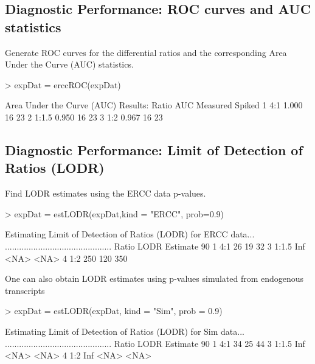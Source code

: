 \documentclass{article}
\begin{document}
\subsection{Diagnostic Performance: ROC curves and AUC statistics}
Generate ROC curves for the differential ratios and the corresponding Area Under
the Curve (AUC) statistics.
\begin{center}
\begin{Schunk}
\begin{Sinput}
> expDat = erccROC(expDat)
\end{Sinput}
\begin{Soutput}
Area Under the Curve (AUC) Results:
  Ratio   AUC Measured Spiked
1   4:1 1.000       16     23
2 1:1.5 0.950       16     23
3   1:2 0.967       16     23
\end{Soutput}
\end{Schunk}
\end{center}

\subsection{Diagnostic Performance: Limit of Detection of Ratios (LODR)}
Find LODR estimates using the ERCC data p-values.
\begin{center}
\begin{Schunk}
\begin{Sinput}
> expDat = estLODR(expDat,kind = "ERCC", prob=0.9)
\end{Sinput}
\begin{Soutput}
Estimating Limit of Detection of Ratios (LODR) for  ERCC  data...
.............................................
  Ratio LODR Estimate 90%
1   4:1            26                 19                 32
3 1:1.5           Inf               <NA>               <NA>
4   1:2           250                120                350
\end{Soutput}
\end{Schunk}
\end{center}


One can also obtain LODR estimates using p-values simulated from endogenous transcripts
\begin{center}
\begin{Schunk}
\begin{Sinput}
> expDat = estLODR(expDat, kind = "Sim", prob = 0.9)  
\end{Sinput}
\begin{Soutput}
Estimating Limit of Detection of Ratios (LODR) for  Sim  data...
.............................................
  Ratio LODR Estimate 90%
1   4:1            34                 25                 44
3 1:1.5           Inf               <NA>               <NA>
4   1:2           Inf               <NA>               <NA>
\end{Soutput}
\end{Schunk}
\end{center}
\end{document}
